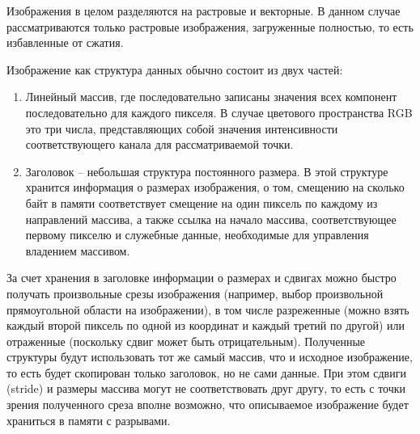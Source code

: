 
Изображения в целом разделяются на растровые и векторные. В данном случае рассматриваются только растровые изображения, загруженные полностью, то есть избавленные от сжатия.

Изображение как структура данных обычно состоит из двух частей:
\begin{enumerate}
\item
    Линейный массив, где последовательно записаны значения всех компонент последовательно для каждого пикселя. В случае цветового пространства RGB это три числа, представляющих собой значения интенсивности соответствующего канала для рассматриваемой точки.
\item
    Заголовок -- небольшая структура постоянного размера. В этой структуре хранится информация о размерах изображения, о том, смещению на сколько байт в памяти соответствует смещение на один пиксель по каждому из направлений массива, а также ссылка на начало массива, соответствующее первому пикселю и служебные данные, необходимые для управления владением массивом.
\end{enumerate}

За счет хранения в заголовке информации о размерах и сдвигах можно быстро получать произвольные срезы изображения (например, выбор произвольной прямоугольной области на изображении), в том числе разреженные (можно взять каждый второй пиксель по одной из координат и каждый третий по другой) или отраженные (поскольку сдвиг может быть отрицательным). Полученные структуры будут использовать тот же самый массив, что и исходное изображение, то есть будет скопирован только заголовок, но не сами данные. При этом сдвиги (stride) и размеры массива могут не соответствовать друг другу, то есть с точки зрения полученного среза вполне возможно, что описываемое изображение будет храниться в памяти с разрывами.


